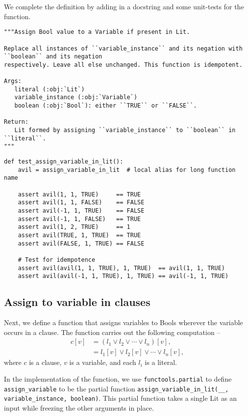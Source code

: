\documentclass[11pt]{article}
\begin{document}
We complete the definition by adding in a docstring and some unit-tests for
the function.
\begin{verbatim}
"""Assign Bool value to a Variable if present in Lit.

Replace all instances of ``variable_instance`` and its negation with ``boolean`` and its negation
respectively. Leave all else unchanged. This function is idempotent.

Args:
   literal (:obj:`Lit`)
   variable_instance (:obj:`Variable`)
   boolean (:obj:`Bool`): either ``TRUE`` or ``FALSE``.

Return:
   Lit formed by assigning ``variable_instance`` to ``boolean`` in ``literal``.
"""
\end{verbatim}


\begin{verbatim}
def test_assign_variable_in_lit():
    avil = assign_variable_in_lit  # local alias for long function name

    assert avil(1, 1, TRUE)     == TRUE
    assert avil(1, 1, FALSE)    == FALSE
    assert avil(-1, 1, TRUE)    == FALSE
    assert avil(-1, 1, FALSE)   == TRUE
    assert avil(1, 2, TRUE)     == 1
    assert avil(TRUE, 1, TRUE)  == TRUE
    assert avil(FALSE, 1, TRUE) == FALSE

    # Test for idempotence
    assert avil(avil(1, 1, TRUE), 1, TRUE)  == avil(1, 1, TRUE)
    assert avil(avil(-1, 1, TRUE), 1, TRUE) == avil(-1, 1, TRUE)
\end{verbatim}

\subsection{Assign to variable in clauses}
\label{sec:org920ac88}
Next, we define a function that assigns variables to Bools wherever the
variable occurs in a clause. The function carries out the following computation --
\begin{align*}
  c[v] &= (l_1 \vee l_2 \vee \cdots \vee l_n)[v],\\
       &= l_1[v] \vee l_2[v] \vee \cdots \vee l_n[v],
\end{align*}
where \(c\) is a clause, \(v\) is a variable, and each \(l_i\) is a literal.

In the implementation of the function, we use \texttt{functools.partial} to define
\texttt{assign\_variable} to be the partial function \texttt{assign\_variable\_in\_lit(\_\_,
variable\_instance, boolean)}. This partial function takes a single Lit as
an input while freezing the other arguments in place.
\end{document}

